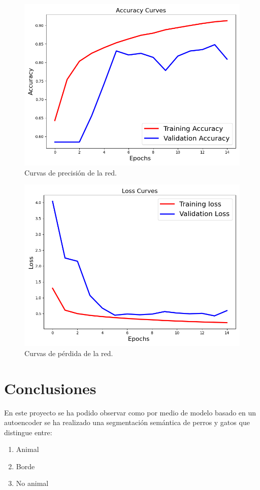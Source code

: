 \documentclass[a4paper]{article}
\newcommand\imgScale {0.6}
\begin{document}
\begin{figure}[hbtp]
    \centering
    \includegraphics[scale=\imgScale]{img/accs.png}
    \caption{\small Curvas de precisión de la red.}
    \label{fig:acc}
\end{figure}
\begin{figure}[hbtp]
    \centering
    \includegraphics[scale=\imgScale]{img/losses.png}   
    \caption{\small Curvas de pérdida de la red.}
    \label{fig:loss}
\end{figure}
\section{Conclusiones}
En este proyecto se ha podido observar como por medio de modelo basado en un autoencoder se ha realizado una segmentación semántica de perros y gatos que distingue entre:
\begin{enumerate}
    \item Animal
    \item Borde
    \item No animal
\end{enumerate}
\end{document}
